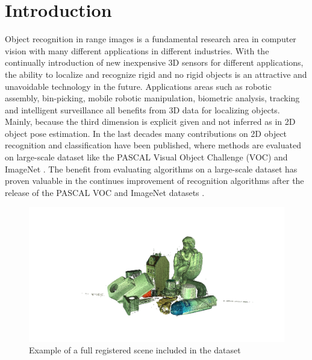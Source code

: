\documentclass[10pt,twocolumn,letterpaper]{article}
\begin{document}

\section{Introduction} %
Object recognition in range images is a fundamental research area in computer vision with many different applications in different industries. With the continually introduction of new inexpensive 3D sensors for different applications, the ability to localize and recognize rigid and no rigid objects is an attractive and unavoidable technology in the future. Applications areas such as robotic assembly, bin-picking, mobile robotic manipulation, biometric analysis, tracking and intelligent surveillance all benefits from 3D data for localizing objects. Mainly, because the third dimension is explicit given and not inferred as in 2D object pose estimation. In the last decades many contributions on 2D object recognition and classification have been published, where methods are evaluated on large-scale dataset like the PASCAL Visual Object Challenge (VOC) \cite{Everingham2014} and ImageNet \cite{Imagenet2009}. The benefit from evaluating algorithms on a large-scale dataset has proven valuable in the continues improvement of recognition algorithms after the release of the PASCAL VOC and ImageNet datasets \cite{Everingham2014}.
\begin{figure}[t]
\centering
\includegraphics[clip, trim=14cm 5cm 10cm 5cm,width=0.8\linewidth, height= 0.8\linewidth, keepaspectratio]{img/scenes/full_scene00.png}
\caption{Example of a full registered scene included in the dataset}
\label{fig:scene}
\end{figure}
\end{document}
